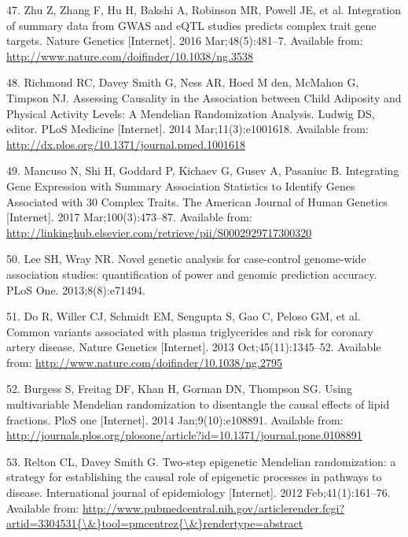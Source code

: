 \documentclass[]{article}
\begin{document}
\hypertarget{ref-Zhu2016}{}
47. Zhu Z, Zhang F, Hu H, Bakshi A, Robinson MR, Powell JE, et al.
Integration of summary data from GWAS and eQTL studies predicts complex
trait gene targets. Nature Genetics {[}Internet{]}. 2016
Mar;48(5):481--7. Available from:
\url{http://www.nature.com/doifinder/10.1038/ng.3538}

\hypertarget{ref-Richmond2014}{}
48. Richmond RC, Davey Smith G, Ness AR, Hoed M den, McMahon G, Timpson
NJ. Assessing Causality in the Association between Child Adiposity and
Physical Activity Levels: A Mendelian Randomization Analysis. Ludwig DS,
editor. PLoS Medicine {[}Internet{]}. 2014 Mar;11(3):e1001618. Available
from: \url{http://dx.plos.org/10.1371/journal.pmed.1001618}

\hypertarget{ref-Mancuso2017}{}
49. Mancuso N, Shi H, Goddard P, Kichaev G, Gusev A, Pasaniuc B.
Integrating Gene Expression with Summary Association Statistics to
Identify Genes Associated with 30 Complex Traits. The American Journal
of Human Genetics {[}Internet{]}. 2017 Mar;100(3):473--87. Available
from:
\url{http://linkinghub.elsevier.com/retrieve/pii/S0002929717300320}

\hypertarget{ref-Lee2013c}{}
50. Lee SH, Wray NR. Novel genetic analysis for case-control genome-wide
association studies: quantification of power and genomic prediction
accuracy. PLoS One. 2013;8(8):e71494.

\hypertarget{ref-Do2013}{}
51. Do R, Willer CJ, Schmidt EM, Sengupta S, Gao C, Peloso GM, et al.
Common variants associated with plasma triglycerides and risk for
coronary artery disease. Nature Genetics {[}Internet{]}. 2013
Oct;45(11):1345--52. Available from:
\url{http://www.nature.com/doifinder/10.1038/ng.2795}

\hypertarget{ref-Burgess2014a}{}
52. Burgess S, Freitag DF, Khan H, Gorman DN, Thompson SG. Using
multivariable Mendelian randomization to disentangle the causal effects
of lipid fractions. PloS one {[}Internet{]}. 2014 Jan;9(10):e108891.
Available from:
\url{http://journals.plos.org/plosone/article?id=10.1371/journal.pone.0108891}

\hypertarget{ref-Relton2012}{}
53. Relton CL, Davey Smith G. Two-step epigenetic Mendelian
randomization: a strategy for establishing the causal role of epigenetic
processes in pathways to disease. International journal of epidemiology
{[}Internet{]}. 2012 Feb;41(1):161--76. Available from:
\href{http://www.pubmedcentral.nih.gov/articlerender.fcgi?artid=3304531\%7B/\&\%7Dtool=pmcentrez\%7B/\&\%7Drendertype=abstract}{http://www.pubmedcentral.nih.gov/articlerender.fcgi?artid=3304531\{\textbackslash{}\&\}tool=pmcentrez\{\textbackslash{}\&\}rendertype=abstract}
\end{document}
